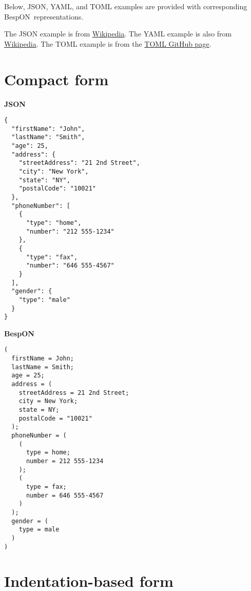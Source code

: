 \documentclass[11pt]{article}
\newcommand{\bespon}{BespON}
\begin{document}
\begin{appendices}

Below, JSON, YAML, and TOML examples are provided with corresponding \bespon\ representations.

The JSON example is from \href{https://en.wikipedia.org/wiki/JSON}{Wikipedia}.  The YAML example is also from \href{https://en.wikipedia.org/wiki/YAML}{Wikipedia}.  The TOML example is from the \href{https://github.com/toml-lang/toml}{TOML GitHub page}.


\section{Compact form}


\begin{tcolorbox}{}
\begin{multicols}{2}

\centering \textbf{JSON}
\begin{Verbatim}[formatcom=\color{DarkGreen}]
{
  "firstName": "John",
  "lastName": "Smith",
  "age": 25,
  "address": {
    "streetAddress": "21 2nd Street",
    "city": "New York",
    "state": "NY",
    "postalCode": "10021"
  },
  "phoneNumber": [
    {
      "type": "home",
      "number": "212 555-1234"
    },
    {
      "type": "fax",
      "number": "646 555-4567"
    }
  ],
  "gender": {
    "type": "male"
  }
}
\end{Verbatim}
\columnbreak
\centering \textbf{BespON}

\begin{Verbatim}
(
  firstName = John;
  lastName = Smith;
  age = 25;
  address = (
    streetAddress = 21 2nd Street;
    city = New York;
    state = NY;
    postalCode = "10021"
  );
  phoneNumber = (
    (
      type = home;
      number = 212 555-1234
    );
    (
      type = fax;
      number = 646 555-4567
    )
  );
  gender = (
    type = male
  )
)
\end{Verbatim}
\end{multicols}
\end{tcolorbox}



\section{Indentation-based form}


\begin{tcolorbox}{}
\begin{multicols}{2}


\end{multicols}
\end{tcolorbox}
\end{appendices}
\end{document}
